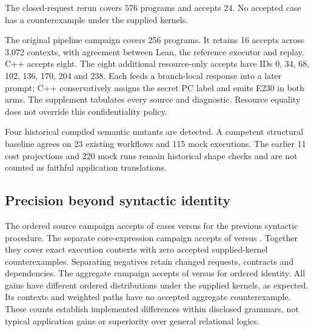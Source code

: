 \documentclass[preprint,12pt,a4paper]{elsarticle}
\begin{document}
The closed-request rerun covers 576 programs and accepts 24.
No accepted case has a counterexample under the supplied kernels.

The original pipeline campaign covers 256 programs. It retains 16 accepts
across 3,072 contexts, with agreement between Lean,
the reference executor and replay. C++ accepts eight. The eight additional
resource-only accepts have IDs 0, 34, 68, 102, 136, 170, 204 and 238.
Each feeds a branch-local response into a later prompt; C++ conservatively
assigns the secret PC label and emits E230 in both arms. The supplement
tabulates every source and diagnostic. Resource equality does not override
this confidentiality policy.

Four historical compiled semantic mutants are detected. A competent structural
baseline agrees on 23 existing workflows and 115 mock executions. The earlier
11 cost projections and 220 mock runs remain historical shape checks and are
not counted as faithful application translations.

\subsection{Precision beyond syntactic identity}
\begin{table}[!ht]
\centering\small

\caption{Constructed precision cases. The aggregate row changes the observer;
it does not preserve ordered traces.}
\label{tab:precision}
\end{table}
The ordered source campaign accepts \revPrecisionSourceAccepted{} of
\revPrecisionSourceCases{} cases versus \revPrecisionSourceBaseline{} for the
previous syntactic procedure. The separate core-expression campaign accepts
\revPrecisionCoreAccepted{} of \revPrecisionCoreCases{} versus
\revPrecisionCoreBaseline{}. Together they cover \revPrecisionContexts{}
exact execution contexts with zero accepted supplied-kernel counterexamples.
Separating negatives retain changed requests, contracts and dependencies.
The aggregate campaign accepts \revAggregateAccepted{} of
\revAggregateCases{} versus \revAggregateBaseline{} for ordered identity.
All \revAggregateGains{} gains have different ordered distributions under the
supplied kernels, as expected. Its \revAggregateContexts{} contexts and
\revAggregatePaths{} weighted paths have no accepted aggregate counterexample.
These counts establish implemented differences within disclosed grammars,
not typical application gains or superiority over general relational logics.
\end{document}

